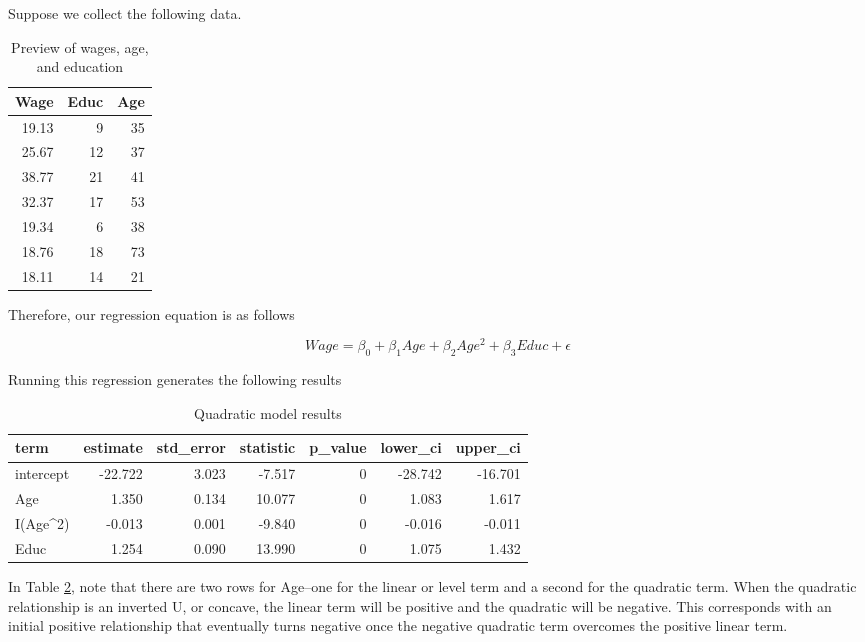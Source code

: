 \documentclass[
]{book}
\begin{document}
Suppose we collect the following data.

\begin{table}

\caption{\label{tab:wagestab}Preview of wages, age, and education}
\centering
\begin{tabular}[t]{r|r|r}
\hline
Wage & Educ & Age\\
\hline
19.13 & 9 & 35\\
\hline
25.67 & 12 & 37\\
\hline
38.77 & 21 & 41\\
\hline
32.37 & 17 & 53\\
\hline
19.34 & 6 & 38\\
\hline
18.76 & 18 & 73\\
\hline
18.11 & 14 & 21\\
\hline
\end{tabular}
\end{table}

Therefore, our regression equation is as follows

\begin{equation}
Wage = \beta_0 + \beta_1Age + \beta_2Age^2 + \beta_3Educ + \epsilon
\label{eq:quadraticex}
\end{equation}

Running this regression generates the following results

\begin{table}

\caption{\label{tab:quadextab}Quadratic model results}
\centering
\begin{tabular}[t]{l|r|r|r|r|r|r}
\hline
term & estimate & std\_error & statistic & p\_value & lower\_ci & upper\_ci\\
\hline
intercept & -22.722 & 3.023 & -7.517 & 0 & -28.742 & -16.701\\
\hline
Age & 1.350 & 0.134 & 10.077 & 0 & 1.083 & 1.617\\
\hline
I(Age\textasciicircum{}2) & -0.013 & 0.001 & -9.840 & 0 & -0.016 & -0.011\\
\hline
Educ & 1.254 & 0.090 & 13.990 & 0 & 1.075 & 1.432\\
\hline
\end{tabular}
\end{table}

In Table \ref{tab:quadextab}, note that there are two rows for Age--one for the linear or level term and a second for the quadratic term. When the quadratic relationship is an inverted U, or concave, the linear term will be positive and the quadratic will be negative. This corresponds with an initial positive relationship that eventually turns negative once the negative quadratic term overcomes the positive linear term.
\end{document}
